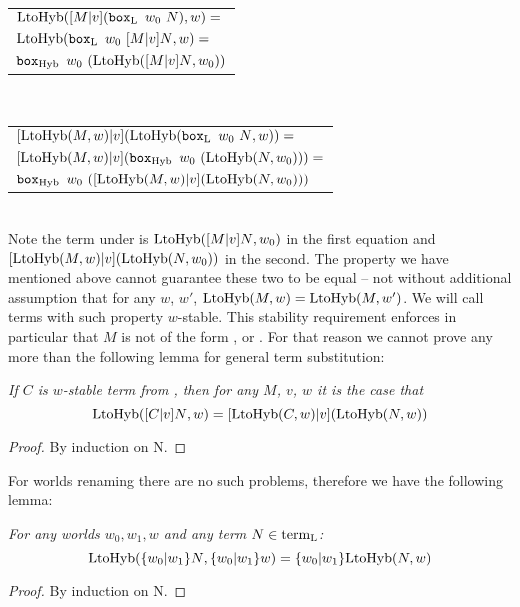 \begin{tabular}{ l }
$\funLtoHyb{{\substt{M}{v}{(\bbox[\tL]{w_0}{N})}}}{w} = $ \\[0.1cm]
$\funLtoHyb{\bbox[\tL]{w_0}{\substt{M}{v}{N}}}{w} = $ \\[0.1cm]
$\bbox[\tHyb]{w_0}{(\funLtoHyb{\substt{M}{v}{N}}{w_0})}$ \\[0.5cm]
\end{tabular}\\
\begin{tabular}{ l }
$\substt{\funLtoHyb{M}{w}}{v}{(\funLtoHyb{\bbox[\tL]{w_0}{N}}{w})} = $\\[0.2cm]
$\substt{\funLtoHyb{M}{w}}{v}{(\bbox[\tHyb]{w_0}{(\funLtoHyb{N}{w_0})})} = $\\[0.2cm]
$\bbox[\tHyb]{w_0}{(\substt{\funLtoHyb{M}{w}}{v}{{(\funLtoHyb{N}{w_0})}})}$\\[0.5cm]
\end{tabular}\\

Note the term under \bboxe{} is $\funLtoHyb{\substt{M}{v}{N}}{w_0}$ in the first equation and $\substt{\funLtoHyb{M}{w}}{v}{{(\funLtoHyb{N}{w_0})}}$ in the second. The property we have mentioned above cannot guarantee these two to be equal -- not without additional assumption that for any $w$, $w'$, $\funLtoHyb{M}{w} = \funLtoHyb{M}{w'}$. We will call terms with such property $w$-stable. This stability requirement enforces in particular that $M$ is not of the form ,  or . For that reason we cannot prove any more than the following lemma for general term substitution:

\begin{lemma}\em
If $C$ is $w$-stable term from \langL{}, then for any $M$, $v$, $w$ it is the case that 
$$\funLtoHyb{\substt{C}{v}{N}}{w} = \substt{\funLtoHyb{C}{w}}{v}{(\funLtoHyb{N}{w})}$$
\begin{proof}
By induction on N.
\end{proof}
\end{lemma}

For worlds renaming there are no such problems, therefore we have the following lemma:

\begin{lemma}\em
For any worlds $w_0, w_1, w$ and any term $N \in \teL$:
$$\funLtoHyb{\substw{w_0}{w_1}{N}}{\substw{w_0}{w_1}{w}} = \substw{w_0}{w_1}{\funLtoHyb{N}{w}}$$
\begin{proof}
By induction on N.
\end{proof}
\end{lemma}

